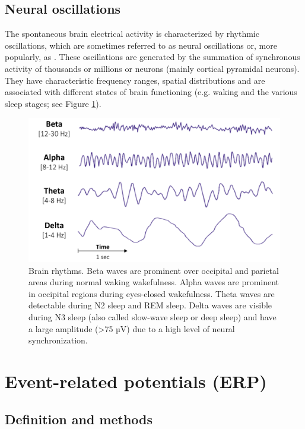 \subsection{Neural oscillations}
\label{sec:eeg:eeg:neural}

The spontaneous brain electrical activity is characterized by rhythmic oscillations, which are sometimes referred to as neural oscillations or, more popularly, as . These oscillations are generated by the summation of synchronous activity of thousands or millions or neurons (mainly cortical pyramidal neurons). They have characteristic frequency ranges, spatial distributions and are associated with different states of brain functioning (e.g. waking and the various sleep stages; see Figure \ref{fig:methods:neural}).

\begin{figure}[htb]
	\includegraphics[width=\textwidth]{Fig/Methods/EEG_BrainWaves/EEG_Brain_Waves.png}
	\caption[Brain rhythms]{Brain rhythms. Beta waves are prominent over occipital and parietal areas during normal waking wakefulness. Alpha waves are prominent in occipital regions during eyes-closed wakefulness. Theta waves are detectable during N2 sleep and REM sleep. Delta waves are visible during N3 sleep (also called slow-wave sleep or deep sleep) and have a large amplitude (>75 µV) due to a high level of neural synchronization.}
	\label{fig:methods:neural}
\end{figure}

\section{Event-related potentials (ERP)}
\label{sec:eeg:erp}

\subsection{Definition and methods}
\label{sec:eeg:erp:def}

